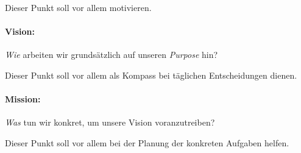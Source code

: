 Dieser Punkt soll vor allem motivieren.

\paragraph{Vision:} \emph{Wie} arbeiten wir grundsätzlich auf unseren \emph{Purpose} hin?

Dieser Punkt soll vor allem als Kompass bei täglichen Entscheidungen dienen.

\paragraph{Mission:} \emph{Was} tun wir konkret, um unsere Vision voranzutreiben?

Dieser Punkt soll vor allem bei der Planung der konkreten Aufgaben helfen.

